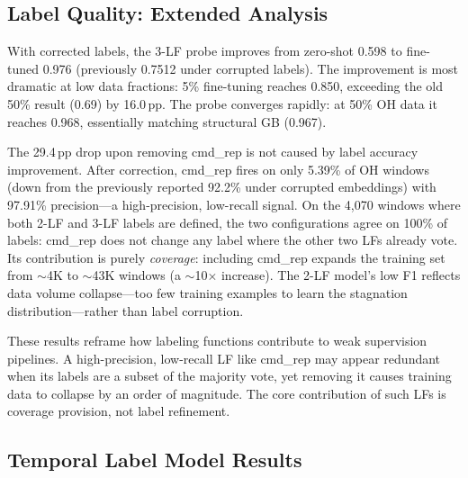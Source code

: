 \subsection{Label Quality: Extended Analysis}
\label{sec:app_label_quality}

With corrected labels, the 3-LF probe improves from zero-shot 0.598 to fine-tuned 0.976 (previously 0.7512 under corrupted labels).
The improvement is most dramatic at low data fractions: 5\% fine-tuning reaches 0.850, exceeding the old 50\% result (0.69) by 16.0\,pp.
The probe converges rapidly: at 50\% OH data it reaches 0.968, essentially matching structural GB (0.967).

The 29.4\,pp drop upon removing cmd\_rep is not caused by label accuracy improvement.
After correction, cmd\_rep fires on only 5.39\% of OH windows (down from the previously reported 92.2\% under corrupted embeddings) with 97.91\% precision---a high-precision, low-recall signal.
On the 4,070 windows where both 2-LF and 3-LF labels are defined, the two configurations agree on 100\% of labels: cmd\_rep does not change any label where the other two LFs already vote.
Its contribution is purely \emph{coverage}: including cmd\_rep expands the training set from ${\sim}$4K to ${\sim}$43K windows (a ${\sim}$10$\times$ increase).
The 2-LF model's low F1 reflects data volume collapse---too few training examples to learn the stagnation distribution---rather than label corruption.

These results reframe how labeling functions contribute to weak supervision pipelines.
A high-precision, low-recall LF like cmd\_rep may appear redundant when its labels are a subset of the majority vote, yet removing it causes training data to collapse by an order of magnitude.
The core contribution of such LFs is coverage provision, not label refinement.

\subsection{Temporal Label Model Results}
\label{sec:app_tlm_results}

